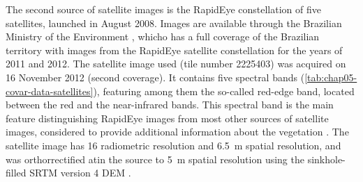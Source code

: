 The second source of satellite images is the RapidEye constellation of five satellites, launched in August 
\num{2008}. Images are available through the Brazilian Ministry of the Environment \cite{Brasil2012}, whicho 
has a full coverage of the Brazilian territory with images from the RapidEye satellite constellation for the 
years of \num{2011} and \num{2012}. The satellite image used (tile number \num{2225403}) was acquired on 
\num{16} November \num{2012} (second coverage). It contains five spectral bands 
(\autoref{tab:chap05-covar-data-satellites}), featuring among them the so-called red-edge band, located between 
the 
red and the near-infrared bands. This spectral band is the main feature distinguishing RapidEye images from 
most other sources of satellite images, considered to provide additional information about the vegetation 
\cite{WeicheltEtAl2013}. The satellite image has \SI{16}{\bit} radiometric resolution and \SI{6.5}{\m} spatial 
resolution, and was orthorrectified atin the source to \SI{5}{\m} spatial resolution using the sinkhole-filled 
SRTM 
version \num{4} DEM \cite{RapidEye2013}.

%    
%   
%  
%    
%    

